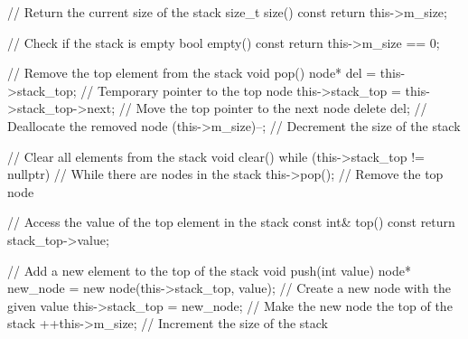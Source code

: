 \documentclass{report}
\begin{document}
    \pagebreak \bigbreak \noindent 
    \begin{cppcode}
    // Return the current size of the stack
    size_t size() const {
        return this->m_size;
    }

    // Check if the stack is empty
    bool empty() const {
        return this->m_size == 0;
    }

    // Remove the top element from the stack
    void pop(){
        node* del = this->stack_top; // Temporary pointer to the top node
        this->stack_top = this->stack_top->next; // Move the top pointer to the next node
        delete del; // Deallocate the removed node
        (this->m_size)--; // Decrement the size of the stack
    }

    // Clear all elements from the stack
    void clear(){
        while (this->stack_top != nullptr) { // While there are nodes in the stack
            this->pop(); // Remove the top node
        }
    }

    // Access the value of the top element in the stack
    const int& top() const{
        return stack_top->value;
    }

    // Add a new element to the top of the stack
    void push(int value){
        node* new_node = new node(this->stack_top, value); // Create a new node with the given value
        this->stack_top = new_node; // Make the new node the top of the stack
        ++this->m_size; // Increment the size of the stack
    }
    \end{cppcode}
\end{document}
